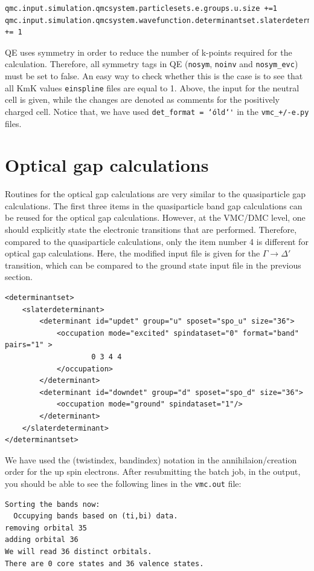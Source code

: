 \begin{lstlisting}
qmc.input.simulation.qmcsystem.particlesets.e.groups.u.size +=1
qmc.input.simulation.qmcsystem.wavefunction.determinantset.slaterdeterminant.determinants.updet.size += 1
\end{lstlisting}
QE uses symmetry in order to reduce the number of k-points required for the calculation. 
Therefore, all symmetry tags in QE (\texttt{nosym}, \texttt{noinv} and \texttt{nosym\_evc}) must be set to false. 
An easy way to check whether this is the case is to see that all KmK values \texttt{einspline} files are equal to 1. 
Above, the input for the neutral cell is given, while the changes are denoted as comments for the positively charged cell. 
Notice that, we have used \texttt{det\_format      = \char`\'old\char`\'} in the \texttt{vmc\_+/-e.py} files.
\section{Optical gap calculations}
Routines for the optical gap calculations are very similar to the quasiparticle gap calculations. 
The first three items in the quasiparticle band gap calculations can be reused for the optical gap calculations. 
However, at the VMC/DMC level, one should explicitly state the electronic transitions that are performed. 
Therefore, compared to the quasiparticle calculations, only the item number 4 is different for optical gap calculations. 
Here, the modified input file is given for the $\Gamma\rightarrow\Delta'$ transition, which can be compared to the ground state input file in the previous section. 
\begin{lstlisting}
<determinantset>
	<slaterdeterminant>
		<determinant id="updet" group="u" sposet="spo_u" size="36">
		    <occupation mode="excited" spindataset="0" format="band" pairs="1" >
					0 3 4 4
		    </occupation>
		</determinant>
		<determinant id="downdet" group="d" sposet="spo_d" size="36">
		    <occupation mode="ground" spindataset="1"/>	
		</determinant>
	</slaterdeterminant>
</determinantset>
\end{lstlisting}
We have used the (twistindex, bandindex) notation in the annihilaion/creation order for the up spin electrons.
After resubmitting the batch job, in the output, you should be able to see the following lines in the \texttt{vmc.out} file:
\begin{lstlisting}
Sorting the bands now:
  Occupying bands based on (ti,bi) data.
removing orbital 35
adding orbital 36
We will read 36 distinct orbitals.
There are 0 core states and 36 valence states.
\end{lstlisting}
